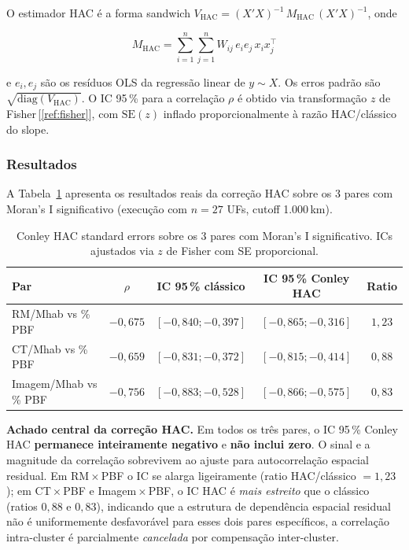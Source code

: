 \documentclass[12pt,a4paper,oneside]{article}
\begin{document}
O estimador HAC é a forma sandwich
$V_{\text{HAC}} = (X'X)^{-1} \, M_{\text{HAC}} \, (X'X)^{-1}$,
onde

\begin{equation}
M_{\text{HAC}} = \sum_{i=1}^{n}\sum_{j=1}^{n} W_{ij}\, e_i e_j\,
x_i x_j^\top
\label{eq:hac-meat}
\end{equation}

\noindent
e $e_i, e_j$ são os resíduos OLS da regressão linear de
$y \sim X$. Os erros padrão são $\sqrt{\mathrm{diag}(V_{\text{HAC}})}$.
O IC 95\,\% para a correlação $\rho$ é obtido via transformação
$z$ de Fisher\,[\ref{ref:fisher}], com $\mathrm{SE}(z)$ inflado
proporcionalmente à razão HAC/clássico do slope.

\subsubsection{Resultados}

A Tabela~\ref{tab:conley-hac} apresenta os resultados reais da
correção HAC sobre os 3 pares com Moran's I significativo
(execução com $n=27$ UFs, cutoff 1.000\,km).

\begin{table}[htbp]
\centering
\caption{Conley HAC standard errors sobre os 3 pares com Moran's I
significativo. ICs ajustados via $z$ de Fisher com SE proporcional.}
\label{tab:conley-hac}
\small
\begin{tabular}{l c c c c}
\toprule
\textbf{Par} & \textbf{$\rho$} & \textbf{IC 95\,\% clássico} &
\textbf{IC 95\,\% Conley HAC} & \textbf{Ratio} \\
\midrule
RM/Mhab vs \% PBF      & $-0{,}675$ & $[-0{,}840; -0{,}397]$ & $[-0{,}865; -0{,}316]$ & $1{,}23$ \\
CT/Mhab vs \% PBF      & $-0{,}659$ & $[-0{,}831; -0{,}372]$ & $[-0{,}815; -0{,}414]$ & $0{,}88$ \\
Imagem/Mhab vs \% PBF  & $-0{,}756$ & $[-0{,}883; -0{,}528]$ & $[-0{,}866; -0{,}575]$ & $0{,}83$ \\
\bottomrule
\end{tabular}
\end{table}

\textbf{Achado central da correção HAC.} Em todos os três pares,
o IC 95\,\% Conley HAC \textbf{permanece inteiramente negativo} e
\textbf{não inclui zero}. O sinal e a magnitude da correlação
sobrevivem ao ajuste para autocorrelação espacial residual. Em
RM\,$\times$\,PBF o IC se alarga ligeiramente (ratio HAC/clássico
$= 1{,}23$); em CT\,$\times$\,PBF e Imagem\,$\times$\,PBF, o IC
HAC é \textit{mais estreito} que o clássico
(ratios $0{,}88$ e $0{,}83$), indicando que a estrutura de
dependência espacial residual não é uniformemente
desfavorável \textemdash{} para esses dois pares específicos, a
correlação intra-cluster é parcialmente \textit{cancelada} por
compensação inter-cluster.
\end{document}
